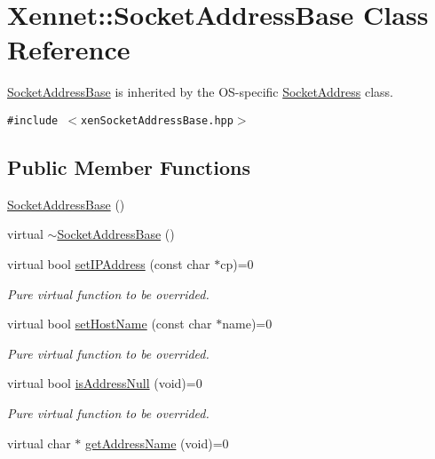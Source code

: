 \hypertarget{classXennet_1_1SocketAddressBase}{
\section{Xennet::SocketAddressBase Class Reference}
\label{classXennet_1_1SocketAddressBase}
}
\hyperlink{classXennet_1_1SocketAddressBase}{SocketAddressBase} is inherited by the OS-specific \hyperlink{classXennet_1_1SocketAddress}{SocketAddress} class.  


{\tt \#include $<$xenSocketAddressBase.hpp$>$}

\subsection*{Public Member Functions}
\begin{CompactItemize}
\item 
\hyperlink{classXennet_1_1SocketAddressBase_7c425dc33914559b83e0a30916aacd46}{SocketAddressBase} ()
\item 
virtual \hyperlink{classXennet_1_1SocketAddressBase_97756e2c34324d84ed2f656e3f941fa1}{$\sim$SocketAddressBase} ()
\item 
virtual bool \hyperlink{classXennet_1_1SocketAddressBase_414d94208d01e7a3edefc1df75ac1e42}{setIPAddress} (const char $\ast$cp)=0
\begin{CompactList}\small\item\em Pure virtual function to be overrided. \item\end{CompactList}\item 
virtual bool \hyperlink{classXennet_1_1SocketAddressBase_d5b5f60871399f28a02aa8bdf6544e42}{setHostName} (const char $\ast$name)=0
\begin{CompactList}\small\item\em Pure virtual function to be overrided. \item\end{CompactList}\item 
virtual bool \hyperlink{classXennet_1_1SocketAddressBase_5d6eb8b8a0218b1bc59b63c16ad82423}{isAddressNull} (void)=0
\begin{CompactList}\small\item\em Pure virtual function to be overrided. \item\end{CompactList}\item 
virtual char $\ast$ \hyperlink{classXennet_1_1SocketAddressBase_400550b2dfd27fb8e5f098e83ca079cc}{getAddressName} (void)=0

\end{CompactItemize}

